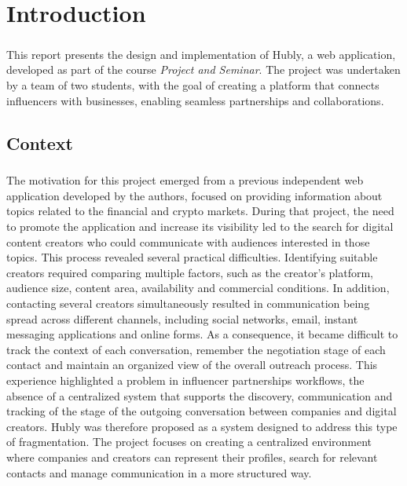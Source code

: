 \chapter{Introduction}

\paragraph{}This report presents the design and implementation of Hubly, a web application,
developed as part of the course \textit{Project and Seminar}. The project was undertaken by a team
of two students, with the goal of creating a platform that connects influencers with businesses, 
enabling seamless partnerships and collaborations.

\section{Context}

\paragraph{}The motivation for this project emerged from a previous independent web application developed by the authors, focused on providing information about topics related to the financial and crypto markets. During that project, the need to promote the application and increase its visibility led to the search for digital content creators who could communicate with audiences interested in those topics. This process revealed several practical difficulties. Identifying suitable creators required comparing multiple factors, such as the creator’s platform, audience size, content area, availability and commercial conditions. In addition, contacting several creators simultaneously resulted in communication being spread across different channels, including social networks, email, instant messaging applications and online forms. As a consequence, it became difficult to track the context of each conversation, remember the negotiation stage of each contact and maintain an organized view of the overall outreach process. This experience highlighted a problem in influencer partnerships workflows, the absence of a centralized system that supports the discovery, communication and tracking of the stage of the outgoing conversation between companies and digital creators. 
Hubly was therefore proposed as a system designed to address this type of fragmentation. The project focuses on creating a centralized environment where companies and creators can represent their profiles, search for relevant contacts and manage communication in a more structured way.

